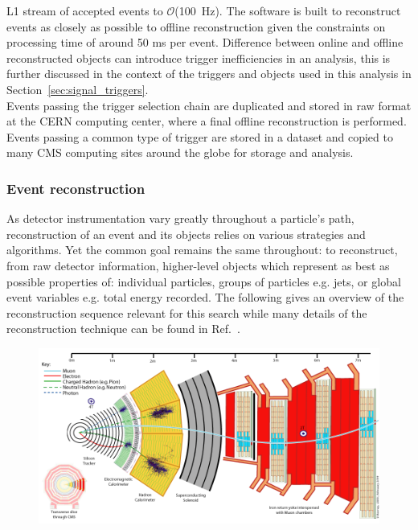 L1 stream of accepted events to $\mathcal{O}$(100~Hz). The software is built to reconstruct
events as closely as possible to offline reconstruction given the constraints on processing time
of around 50 ms per event. Difference between online and offline reconstructed objects can 
introduce trigger inefficiencies in an analysis, this is further discussed in the 
context of the triggers and objects used in this analysis in Section~\ref{sec:signal_triggers}.\\
\indent Events passing the trigger selection chain are duplicated and stored in raw format at
the CERN computing center, where a final offline reconstruction is performed. Events passing
a common type of trigger are stored in a dataset and copied to many CMS computing sites around the
globe for storage and analysis. 
  
\subsubsection{Event reconstruction\label{sec:eventReco}}

As detector instrumentation vary greatly throughout a particle's path, reconstruction
of an event and its objects relies on various strategies and algorithms. Yet the common goal 
remains the same throughout: to reconstruct, from raw detector information,
higher-level objects which represent as best as possible properties of: individual
particles, groups of particles e.g. jets, or global event variables e.g. total energy
recorded. The following gives an overview of the reconstruction sequence relevant for this search
while many details of the reconstruction technique can be found in Ref.~\cite{Bayatian:922757,Bayatian:942733}. 

\begin{figure}[h!]
  \begin{center}
      \includegraphics[width=.9\textwidth,]{figures/CMS_Slice}
      \caption{\label{fig:cmdSlice} }
  \end{center}
\end{figure}

